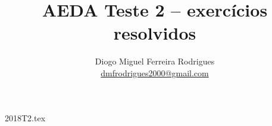 \documentclass{aeda_test}
\title{AEDA Teste 2 -- exercícios resolvidos}
\author{Diogo Miguel Ferreira Rodrigues \\ \href{mailto:dmfrodrigues2000@gmail.com}{dmfrodrigues2000@gmail.com}}
\date{}
\begin{document}
\begingroup
\maketitle
	\let\clearpage\relax
	\tableofcontents
\endgroup
{2018T2.tex}
\end{document}
